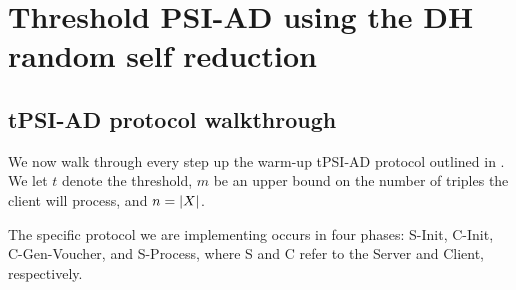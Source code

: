 
\section{Threshold PSI-AD using the DH random self reduction} %
\label{sec:threshold_psi_ad_using_the_dh_random_self_reduction}


\subsection{tPSI-AD protocol walkthrough} %
\label{sub:tpsi_ad_protocol_walkthrough}


We now walk through every step up the warm-up tPSI-AD protocol outlined in \cite{bhowmick2021apple}. We let $t$ denote the threshold, $m$ be an upper bound on the number of triples the client will process, and $n = \left\lvert X\right\rvert$.



The specific protocol we are implementing occurs in four phases: {\sf S-Init}, {\sf C-Init}, {\sf C-Gen-Voucher}, and {\sf S-Process}, where {\sf S} and {\sf C} refer to the Server and Client, respectively.

\begin{algorithm}[H]
\label{alg:server_init}
\begin{algorithmic}[1]
\State
\end{algorithmic}
\end{algorithm}





\begin{algorithm}[H]
\label{alg:client_init}
\begin{algorithmic}[1]
\State
\end{algorithmic}
\end{algorithm}


\begin{algorithm}[H]
\label{alg:client_vouch}
\begin{algorithmic}[1]
\State
\end{algorithmic}
\end{algorithm}


\begin{algorithm}[H]
\label{alg:server_process}
\begin{algorithmic}[1]
\State
\end{algorithmic}
\end{algorithm}

